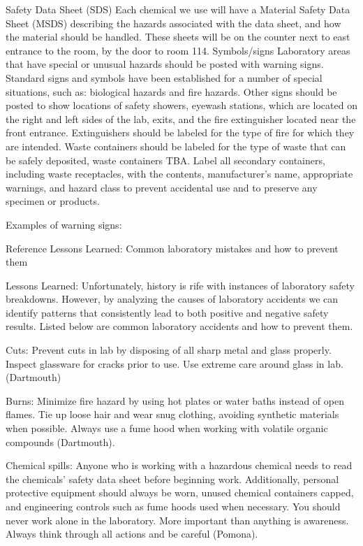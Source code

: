 \documentclass[12pt]{../SOP2}
\begin{document}
Safety Data Sheet (SDS)
Each chemical we use will have a Material Safety Data Sheet (MSDS) describing the hazards associated with the data sheet, and how the material should be handled. These sheets will be on the counter next to east entrance to the room, by the door to room 114. 
Symbols/signs
Laboratory areas that have special or unusual hazards should be posted with warning signs. Standard signs and symbols have been established for a number of special situations, such as: biological hazards and fire hazards. 
Other signs should be posted to show locations of safety showers, eyewash stations, which are located on the right and left sides of the lab, exits, and the fire extinguisher located near the front entrance. Extinguishers should be labeled for the type of fire for which they are intended. Waste containers should be labeled for the type of waste that can be safely deposited, waste containers TBA. Label all secondary containers, including waste receptacles, with the contents, manufacturer’s name, appropriate warnings, and hazard class to prevent accidental use and to preserve any specimen or products. 
	
Examples of  warning signs:


Reference Lessons Learned: Common laboratory mistakes and how to prevent them

Lessons Learned:
Unfortunately, history is rife with instances of laboratory safety breakdowns.  However, by analyzing the causes of laboratory accidents we can identify patterns that consistently lead to both positive and negative safety results.  Listed below are common laboratory accidents and how to prevent them.

Cuts: Prevent cuts in lab by disposing of all sharp metal and glass properly.  Inspect glassware for cracks prior to use.  Use extreme care around glass in lab. (Dartmouth)

Burns: Minimize fire hazard by using hot plates or water baths instead of open flames.  Tie up loose hair and wear snug clothing, avoiding synthetic materials when possible.  Always use a fume hood when working with volatile organic compounds (Dartmouth).

Chemical spills: Anyone who is working with a hazardous chemical needs to read the chemicals’ safety data sheet before beginning work.  Additionally, personal protective equipment should always be worn, unused chemical containers capped, and engineering controls such as fume hoods used when necessary.  You should never work alone in the laboratory.  More important than anything is awareness.  Always think through all actions and be careful (Pomona).
\end{document}
